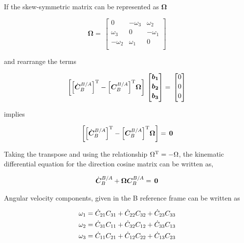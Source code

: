 If the skew-symmetric matrix can be represented as $\bm{\Omega}$

\begin{equation}\label{eqn:Qmatrix}
\bm{\Omega}
=\,
\begin{bmatrix}
0 & - \omega_3 & \omega_2 \\[0.3em]
\omega_3 & 0 & - \omega_1 \\[0.3em]
- \omega_2 & \omega_1 & 0\\[0.3em]
\end{bmatrix}
\end{equation}

and rearrange the terms

\begin{equation}{\label{eqn:C_dot_T_C_T_Omega}}
\bigg[\Big[{\dot{\bm{C}}_B^{B/A}}\Big]^{\rm T} - \Big[{\bm{C}_B^{B/A}}\Big]^{\rm T} \bm{\Omega} \bigg]
\,
\begin{bmatrix}
\bm{b_1}\\[0.2em]
\bm{b_2}\\[0.2em]
\bm{b_3}\\[0.2em]
\end{bmatrix}
 =\,
\begin{bmatrix}
0\\[0.2em]
0\\[0.2em]
0\\[0.2em]
\end{bmatrix}
\end{equation}

implies

\begin{equation}{\label{eqn:C_dot_T_C_T_Omega2}}
\bigg[\Big[{\dot{\bm{C}}_B^{B/A}}\Big]^{\rm T} - \Big[{\bm{C}_B^{B/A}}\Big]^{\rm T} \bm{\Omega} \bigg]
 =\,
\bm{0}
\end{equation}

Taking the transpose and using the relationship $\Omega^{\rm T} = - \Omega$, the kinematic differential equation for the direction cosine matrix can be written as,

\begin{equation}{\label{eqn:kinematicEquDQM}}
{\dot{\bm{C}}_B^{B/A}} + \bm{\Omega} {\bm{C}_B^{B/A}}
 =\,
\bm{0}
\end{equation}

Angular velocity components, given in the B reference frame can be written as

\begin{align}{\label{eqn:angVelocityKinematics}}
\begin{split}
\omega_1 & = \dot{C}_{21} C_{31} + \dot{C}_{22} C_{32} + \dot{C}_{23} C_{33} \\
\omega_2 & = \dot{C}_{31} C_{11} + \dot{C}_{32} C_{12} + \dot{C}_{33} C_{13} \\
\omega_3 & = \dot{C}_{11} C_{21} + \dot{C}_{12} C_{22} + \dot{C}_{13} C_{23} \\
\end{split}
\end{align}

